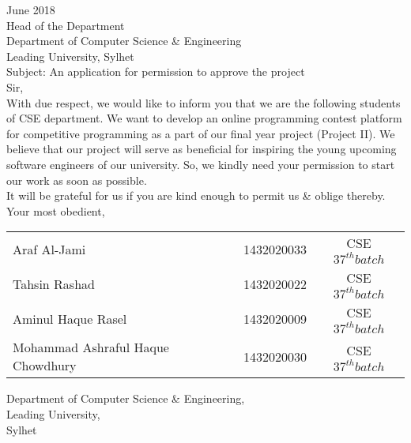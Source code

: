 
 June 2018\\
Head of the Department\\
Department of Computer Science \& Engineering\\
Leading University, Sylhet\\

\noindent Subject: An application for permission to approve the project \\

\noindent Sir, \\
\noindent With due respect, we would like to inform you that we are the following students of CSE department. We want to develop an online programming contest platform for competitive programming as a part of our final year project (Project II). We believe that our project will serve as beneficial for inspiring the young upcoming software engineers of our university. So, we kindly need your permission to start our work as soon as possible. \\
\newline
It will be grateful for us if you are kind enough to permit us \& oblige thereby. \\

\noindent Your most obedient, \\

    \begin{tabular}{l c c}
         Araf Al-Jami & 1432020033 & CSE $37^{th} batch$ \\
         Tahsin Rashad & 1432020022 & CSE $37^{th} batch$ \\
         Aminul Haque Rasel & 1432020009 & CSE $37^{th} batch$ \\
         Mohammad Ashraful Haque Chowdhury & 1432020030 & CSE $37^{th} batch$ \\
         
    \end{tabular}
    
\vspace{20pt}

\noindent Department of Computer Science \& Engineering, \\
Leading University, \\
Sylhet \\

\pagebreak


